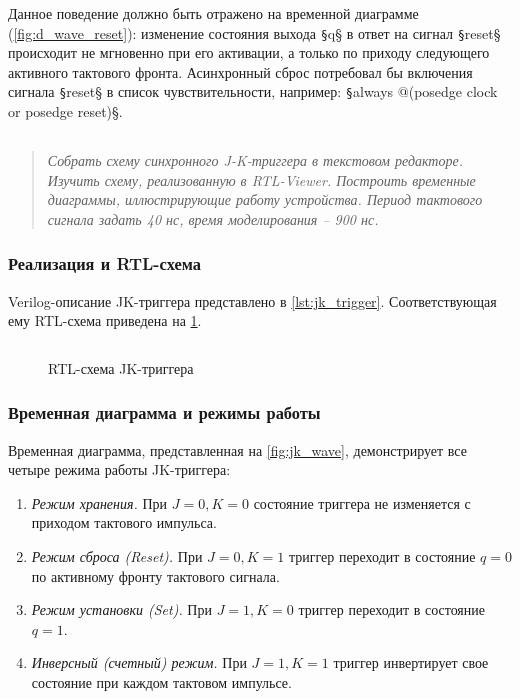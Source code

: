 Данное поведение должно быть отражено на временной диаграмме (\cref{fig:d_wave_reset}): изменение состояния выхода \texttt§q§ в ответ на сигнал \texttt§reset§ происходит не мгновенно при его активации, а только по приходу следующего активного тактового фронта. Асинхронный сброс потребовал бы включения сигнала \texttt§reset§ в список чувствительности, например: \texttt§always @(posedge clock or posedge reset)§.

\subsection*{  }
\begin{quote}
    \textit{Собрать схему синхронного J-K-триггера в текстовом редакторе. Изучить схему, реализованную в RTL-Viewer. Построить временные диаграммы, иллюстрирующие работу устройства. Период тактового сигнала задать 40 нс, время моделирования – 900 нс.}
\end{quote}

\subsubsection*{Реализация и RTL-схема}
Verilog-описание JK-триггера представлено в \cref{lst:jk_trigger}. Соответствующая ему RTL-схема приведена на \cref{fig:jk_rtl}.

\begin{listing}[H]
    \caption{Verilog-описание JK-триггера (jk1.v)}
    \label{lst:jk_trigger}
    \inputminted[]{verilog}{scripts/jk1.v}
\end{listing}

\begin{figure}[H]
    \centering
    
    \caption{RTL-схема JK-триггера}
    \label{fig:jk_rtl}
\end{figure}

\subsubsection*{Временная диаграмма и режимы работы}
Временная диаграмма, представленная на \cref{fig:jk_wave}, демонстрирует все четыре режима работы JK-триггера:
\begin{enumerate}
    \item \textit{Режим хранения.} При $J=0, K=0$ состояние триггера не изменяется с приходом тактового импульса.
    \item \textit{Режим сброса (Reset).} При $J=0, K=1$ триггер переходит в состояние $q=0$ по активному фронту тактового сигнала.
    \item \textit{Режим установки (Set).} При $J=1, K=0$ триггер переходит в состояние $q=1$.
    \item \textit{Инверсный (счетный) режим.} При $J=1, K=1$ триггер инвертирует свое состояние при каждом тактовом импульсе.
\end{enumerate}

